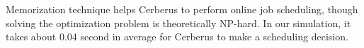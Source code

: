 

Memorization technique helps Cerberus to perform online job scheduling,
though solving the optimization problem is theoretically NP-hard.
In our simulation, it takes about 0.04 second in average for Cerberus to make a scheduling decision.


